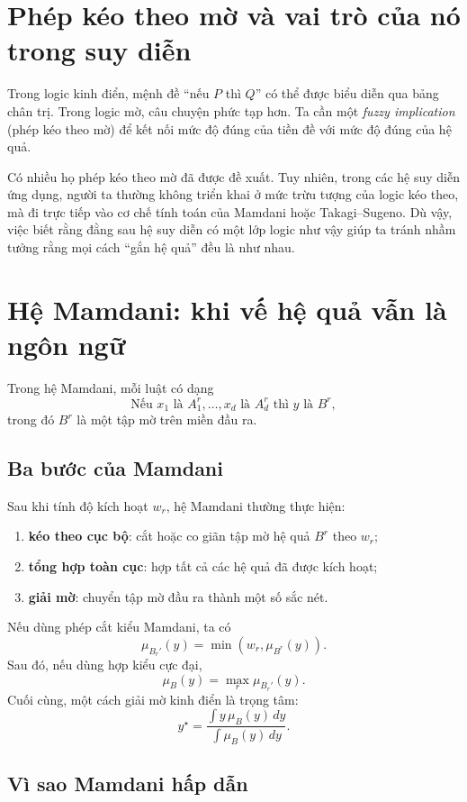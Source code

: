 \section{Phép kéo theo mờ và vai trò của nó trong suy diễn}

Trong logic kinh điển, mệnh đề ``nếu \(P\) thì \(Q\)'' có thể được biểu diễn qua bảng chân trị. Trong logic mờ, câu chuyện phức tạp hơn. Ta cần một \emph{fuzzy implication} (phép kéo theo mờ) để kết nối mức độ đúng của tiền đề với mức độ đúng của hệ quả.

Có nhiều họ phép kéo theo mờ đã được đề xuất. Tuy nhiên, trong các hệ suy diễn ứng dụng, người ta thường không triển khai ở mức trừu tượng của logic kéo theo, mà đi trực tiếp vào cơ chế tính toán của Mamdani hoặc Takagi--Sugeno. Dù vậy, việc biết rằng đằng sau hệ suy diễn có một lớp logic như vậy giúp ta tránh nhầm tưởng rằng mọi cách ``gắn hệ quả'' đều là như nhau.

\section{Hệ Mamdani: khi vế hệ quả vẫn là ngôn ngữ}

Trong hệ Mamdani, mỗi luật có dạng
\[
\text{Nếu } x_1 \text{ là } A_1^r,\dots,x_d \text{ là } A_d^r
\text{ thì } y \text{ là } B^r,
\]
trong đó \(B^r\) là một tập mờ trên miền đầu ra.

\subsection{Ba bước của Mamdani}

Sau khi tính độ kích hoạt \(w_r\), hệ Mamdani thường thực hiện:

\begin{enumerate}
\item \textbf{kéo theo cục bộ}: cắt hoặc co giãn tập mờ hệ quả \(B^r\) theo \(w_r\);
\item \textbf{tổng hợp toàn cục}: hợp tất cả các hệ quả đã được kích hoạt;
\item \textbf{giải mờ}: chuyển tập mờ đầu ra thành một số sắc nét.
\end{enumerate}

Nếu dùng phép cắt kiểu Mamdani, ta có
\[
\mu_{B_r'}(y)=\min(w_r,\mu_{B^r}(y)).
\]
Sau đó, nếu dùng hợp kiểu cực đại,
\[
\mu_{B}(y)=\max_r \mu_{B_r'}(y).
\]
Cuối cùng, một cách giải mờ kinh điển là trọng tâm:
\[
y^\star=\frac{\int y\,\mu_B(y)\,dy}{\int \mu_B(y)\,dy}.
\]

\subsection{Vì sao Mamdani hấp dẫn}

